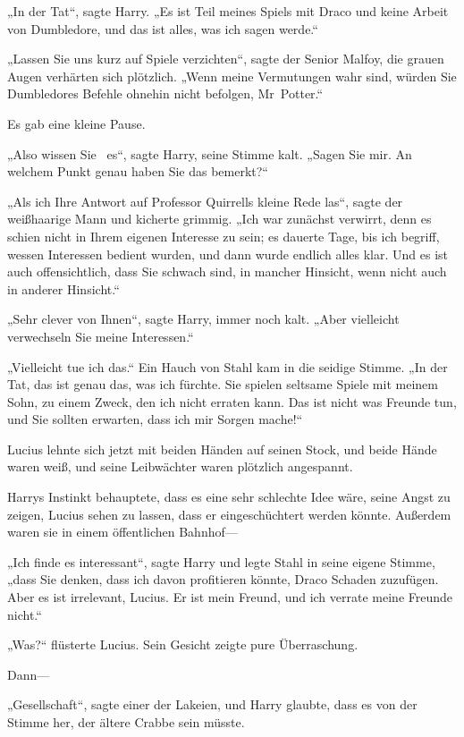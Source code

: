 {„In der Tat“, sagte Harry. „Es ist Teil meines Spiels mit Draco und keine Arbeit von Dumbledore, und das ist alles, was ich sagen werde.“

„Lassen Sie uns kurz auf Spiele verzichten“, sagte der Senior Malfoy, die grauen Augen verhärten sich plötzlich. „Wenn meine Vermutungen wahr sind, würden Sie Dumbledores Befehle ohnehin nicht befolgen, Mr~Potter.“

Es gab eine kleine Pause.

„Also wissen Sie ~es“, sagte Harry, seine Stimme kalt. „Sagen Sie mir. An welchem Punkt genau haben Sie das bemerkt?“

„Als ich Ihre Antwort auf Professor Quirrells kleine Rede las“, sagte der weißhaarige Mann und kicherte grimmig. „Ich war zunächst verwirrt, denn es schien nicht in Ihrem eigenen Interesse zu sein; es dauerte Tage, bis ich begriff, wessen Interessen bedient wurden, und dann wurde endlich alles klar. Und es ist auch offensichtlich, dass Sie schwach sind, in mancher Hinsicht, wenn nicht auch in anderer Hinsicht.“

„Sehr clever von Ihnen“, sagte Harry, immer noch kalt. „Aber vielleicht verwechseln Sie meine Interessen.“

„Vielleicht tue ich das.“ Ein Hauch von Stahl kam in die seidige Stimme. „In der Tat, das ist genau das, was ich fürchte. Sie spielen seltsame Spiele mit meinem Sohn, zu einem Zweck, den ich nicht erraten kann. Das ist nicht was Freunde tun, und Sie sollten erwarten, dass ich mir Sorgen mache!“

Lucius lehnte sich jetzt mit beiden Händen auf seinen Stock, und beide Hände waren weiß, und seine Leibwächter waren plötzlich angespannt.

Harrys Instinkt behauptete, dass es eine sehr schlechte Idee wäre, seine Angst zu zeigen, Lucius sehen zu lassen, dass er eingeschüchtert werden könnte. Außerdem waren sie in einem öffentlichen Bahnhof—

„Ich finde es interessant“, sagte Harry und legte Stahl in seine eigene Stimme, „dass Sie denken, dass ich davon profitieren könnte, Draco Schaden zuzufügen. Aber es ist irrelevant, Lucius. Er ist mein Freund, und ich verrate meine Freunde nicht.“

„Was?“ flüsterte Lucius. Sein Gesicht zeigte pure Überraschung.

Dann—

„Gesellschaft“, sagte einer der Lakeien, und Harry glaubte, dass es von der Stimme her, der ältere Crabbe sein müsste.

}
